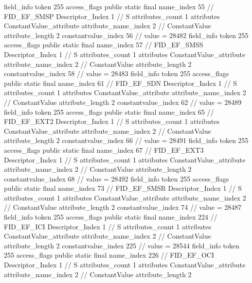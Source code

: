 {{{{{{{				}
				}
			}
			field_info {
				token	255
				access_flags	public static final
				name_index	55		// FID_EF_SMSP
				Descriptor_Index	1		// S
				attributes_count	1
				attributes {
				ConstantValue_attribute {
					attribute_name_index	2		// ConstantValue
					attribute_length	2
					constantvalue_index	56		// value = 28482
				}
				}
			}
			field_info {
				token	255
				access_flags	public static final
				name_index	57		// FID_EF_SMSS
				Descriptor_Index	1		// S
				attributes_count	1
				attributes {
				ConstantValue_attribute {
					attribute_name_index	2		// ConstantValue
					attribute_length	2
					constantvalue_index	58		// value = 28483
				}
				}
			}
			field_info {
				token	255
				access_flags	public static final
				name_index	61		// FID_EF_SDN
				Descriptor_Index	1		// S
				attributes_count	1
				attributes {
				ConstantValue_attribute {
					attribute_name_index	2		// ConstantValue
					attribute_length	2
					constantvalue_index	62		// value = 28489
				}
				}
			}
			field_info {
				token	255
				access_flags	public static final
				name_index	65		// FID_EF_EXT2
				Descriptor_Index	1		// S
				attributes_count	1
				attributes {
				ConstantValue_attribute {
					attribute_name_index	2		// ConstantValue
					attribute_length	2
					constantvalue_index	66		// value = 28491
				}
				}
			}
			field_info {
				token	255
				access_flags	public static final
				name_index	67		// FID_EF_EXT3
				Descriptor_Index	1		// S
				attributes_count	1
				attributes {
				ConstantValue_attribute {
					attribute_name_index	2		// ConstantValue
					attribute_length	2
					constantvalue_index	68		// value = 28492
				}
				}
			}
			field_info {
				token	255
				access_flags	public static final
				name_index	73		// FID_EF_SMSR
				Descriptor_Index	1		// S
				attributes_count	1
				attributes {
				ConstantValue_attribute {
					attribute_name_index	2		// ConstantValue
					attribute_length	2
					constantvalue_index	74		// value = 28487
				}
				}
			}
			field_info {
				token	255
				access_flags	public static final
				name_index	224		// FID_EF_ICI
				Descriptor_Index	1		// S
				attributes_count	1
				attributes {
				ConstantValue_attribute {
					attribute_name_index	2		// ConstantValue
					attribute_length	2
					constantvalue_index	225		// value = 28544
				}
				}
			}
			field_info {
				token	255
				access_flags	public static final
				name_index	226		// FID_EF_OCI
				Descriptor_Index	1		// S
				attributes_count	1
				attributes {
				ConstantValue_attribute {
					attribute_name_index	2		// ConstantValue
					attribute_length	2
}}}}}}}
